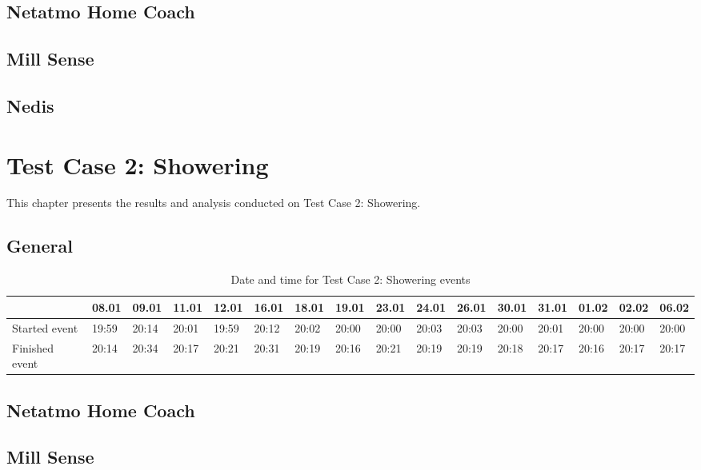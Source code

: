 \subsection{Netatmo Home Coach}
\subsection{Mill Sense}
\subsection{Nedis}

\section{Test Case 2: Showering}
This chapter presents the results and analysis conducted on Test Case 2: Showering. 
\subsection{General}
\begin{table}[!hbtp]
    \centering
    \caption{Date and time for Test Case 2: Showering events}
    \begin{adjustbox}{width=1\textwidth} 
        \begin{tabular}{l|l|l|l|l|l|l|l|l|l|l|l|l|l|l|l|}
            \cline{2-16}
                & 08.01 & 09.01 & 11.01 & 12.01 & 16.01 & 18.01 & 19.01 & 23.01 & 24.01 & 26.01 & 30.01 & 31.01 & 01.02 & 02.02 & 06.02 \\ \hline
            \multicolumn{1}{|l|}{Started event}  & 19:59 & 20:14 & 20:01 & 19:59 & 20:12 & 20:02 & 20:00 & 20:00 & 20:03 & 20:03 & 20:00 & 20:01 & 20:00 & 20:00 & 20:00 \\ \hline
            \multicolumn{1}{|l|}{Finished event} & 20:14 & 20:34 & 20:17 & 20:21 & 20:31 & 20:19 & 20:16 & 20:21 & 20:19 & 20:19 & 20:18 & 20:17 & 20:16 & 20:17 & 20:17 \\ \hline
        \end{tabular}
    \end{adjustbox}
    \label{tab:ShoweringDates}
\end{table}

\subsection{Netatmo Home Coach}
\subsection{Mill Sense}
